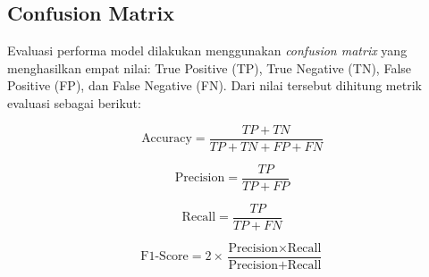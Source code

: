 \subsection{Confusion Matrix}

Evaluasi performa model dilakukan menggunakan \emph{confusion matrix} yang menghasilkan empat nilai: True Positive (TP), True Negative (TN), False Positive (FP), dan False Negative (FN). Dari nilai tersebut dihitung metrik evaluasi sebagai berikut:

\begin{equation}
\text{Accuracy} = \frac{TP + TN}{TP + TN + FP + FN}
\end{equation}

\begin{equation}
\text{Precision} = \frac{TP}{TP + FP}
\end{equation}

\begin{equation}
\text{Recall} = \frac{TP}{TP + FN}
\end{equation}

\begin{equation}
\text{F1-Score} = 2 \times \frac{\text{Precision} \times \text{Recall}}{\text{Precision} + \text{Recall}}
\end{equation}
